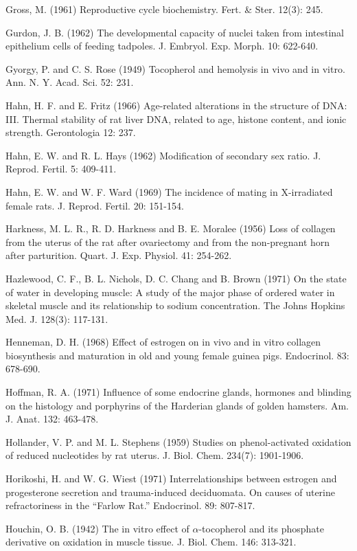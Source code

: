 Gross, M. (1961) Reproductive cycle biochemistry. Fert. \& Ster. 12(3): 245.

Gurdon, J. B. (1962) The developmental capacity of nuclei taken from intestinal epithelium cells of feeding tadpoles. J. Embryol. Exp. Morph. 10: 622-640.

Gyorgy, P. and C. S. Rose (1949) Tocopherol and hemolysis in vivo and in vitro. Ann. N. Y. Acad. Sci. 52: 231.


Hahn, H. F. and E. Fritz (1966) Age-related alterations in the structure of DNA: III. Thermal stability of rat liver DNA, related to age, histone content, and ionic strength. Gerontologia 12: 237.

Hahn, E. W. and R. L. Hays (1962) Modification of secondary sex ratio. J. Reprod. Fertil. 5: 409-411.

Hahn, E. W. and W. F. Ward (1969) The incidence of mating in X-irradiated female rats. J. Reprod. Fertil. 20: 151-154.

Harkness, M. L. R., R. D. Harkness and B. E. Moralee (1956) Loss of collagen from the uterus of the rat after ovariectomy and from the non-pregnant horn after parturition. Quart. J. Exp. Physiol. 41: 254-262.

Hazlewood, C. F., B. L. Nichols, D. C. Chang and B. Brown (1971) On the state of water in developing muscle: A study of the major phase of ordered water in skeletal muscle and its relationship to sodium concentration. The Johns Hopkins Med. J. 128(3): 117-131.

Henneman, D. H. (1968) Effect of estrogen on in vivo and in vitro collagen biosynthesis and maturation in old and young female guinea pigs. Endocrinol. 83: 678-690.

Hoffman, R. A. (1971) Influence of some endocrine glands, hormones and blinding on the histology and porphyrins of the Harderian glands of golden hamsters. Am. J. Anat. 132: 463-478.

Hollander, V. P. and M. L. Stephens (1959) Studies on phenol-activated oxidation of reduced nucleotides by rat uterus. J. Biol. Chem. 234(7): 1901-1906.

Horikoshi, H. and W. G. Wiest (1971) Interrelationships between estrogen and progesterone secretion and trauma-induced deciduomata. On causes of uterine refractoriness in the ``Farlow Rat.'' Endocrinol. 89: 807-817.

Houchin, O. B. (1942) The in vitro effect of $\alpha$-tocopherol and its phosphate derivative on oxidation in muscle tissue. J. Biol. Chem. 146: 313-321.

